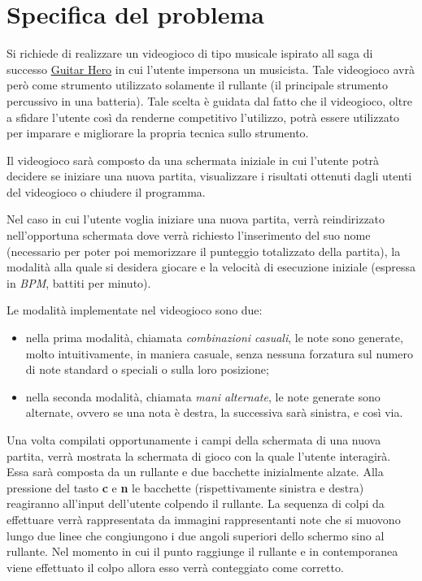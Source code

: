 \section{Specifica del problema}
Si richiede di realizzare un videogioco di tipo musicale ispirato all saga di successo \hyperlink{https://it.wikipedia.org/wiki/Guitar_Hero_(serie)}{Guitar Hero} in cui l'utente impersona un musicista.
Tale videogioco avrà però come strumento utilizzato solamente il rullante (il principale strumento percussivo in una batteria).
Tale scelta è guidata dal fatto che il videogioco, oltre a sfidare l'utente così da renderne competitivo l'utilizzo, potrà essere utilizzato per imparare e migliorare la propria tecnica sullo strumento.

\medskip
Il videogioco sarà composto da una schermata iniziale in cui l'utente potrà decidere se iniziare una nuova partita, visualizzare i risultati ottenuti dagli utenti del videogioco o chiudere il programma.

\medskip
Nel caso in cui l'utente voglia iniziare una nuova partita, verrà reindirizzato nell'opportuna schermata dove verrà richiesto l'inserimento del suo nome (necessario per poter poi memorizzare il punteggio totalizzato della partita), la modalità alla quale si desidera giocare e la velocità di esecuzione iniziale (espressa in \emph{BPM}, battiti per minuto).

\medskip
Le modalità implementate nel videogioco sono due:
\begin{itemize}
        \item nella prima modalità, chiamata \emph{combinazioni casuali}, le note sono generate, molto intuitivamente, in maniera casuale, senza nessuna forzatura sul numero di note standard o speciali o sulla loro posizione;

        \item nella seconda modalità, chiamata \emph{mani alternate}, le note generate sono alternate, ovvero se una nota è destra, la successiva sarà sinistra, e così via.
\end{itemize}

\medskip
Una volta compilati opportunamente i campi della schermata di una nuova partita, verrà mostrata la schermata di gioco con la quale l'utente interagirà.
Essa sarà composta da un rullante e due bacchette inizialmente alzate. Alla pressione del tasto \textbf{c} e \textbf{n} le bacchette (rispettivamente sinistra e destra) reagiranno all'input dell'utente colpendo il rullante.
La sequenza di colpi da effettuare verrà rappresentata da immagini rappresentanti note che si muovono lungo due linee che congiungono i due angoli superiori dello schermo sino al rullante.
Nel momento in cui il punto raggiunge il rullante e in contemporanea viene effettuato il colpo allora esso verrà conteggiato come corretto.

